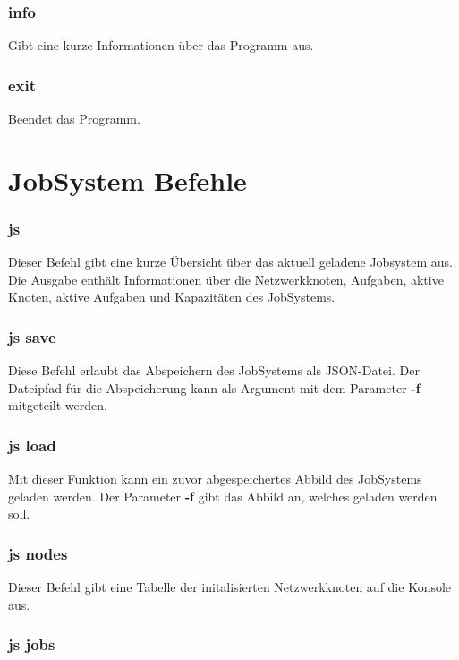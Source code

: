 \documentclass[12pt,a4paper]{report}
\begin{document}
\subsubsection{info}

Gibt eine kurze Informationen über das Programm aus.

\subsubsection{exit}

Beendet das Programm.

\section{JobSystem Befehle}

\subsubsection{js}

Dieser Befehl gibt eine kurze Übersicht über das aktuell geladene Jobsystem aus. Die Ausgabe enthält Informationen über die Netzwerkknoten, Aufgaben, aktive Knoten, aktive Aufgaben und Kapazitäten des JobSystems.

\subsubsection{js save}

Diese Befehl erlaubt das Abspeichern des JobSystems als JSON-Datei. Der Dateipfad für die Abspeicherung kann als Argument mit dem Parameter \textbf{-f} mitgeteilt werden.

\subsubsection{js load}

Mit dieser Funktion kann ein zuvor abgespeichertes Abbild des JobSystems geladen werden. Der Parameter \textbf{-f} gibt das Abbild an, welches geladen werden soll.

\subsubsection{js nodes}

Dieser Befehl gibt eine Tabelle der initalisierten Netzwerkknoten auf die Konsole aus.

\subsubsection{js jobs}
\end{document}
